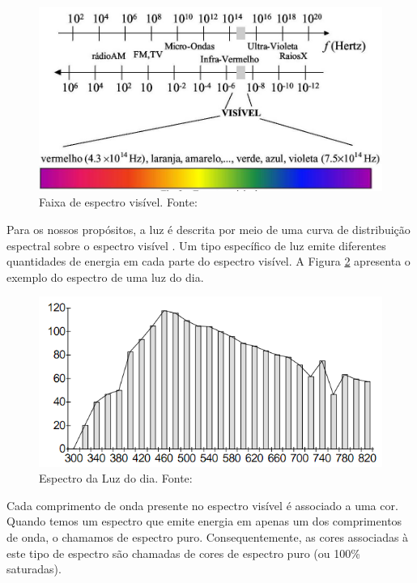 \documentclass[a4paper,10pt]{report}
\begin{document}
\begin{figure}[!htb]
     \centering
     \includegraphics[scale=0.4]{img/visible_spectrum.jpg}
     \caption{Faixa de espectro visível. Fonte:
}
     \label{fig:visible_spectrum}
\end{figure}

\par
Para os nossos propósitos, a luz é descrita por meio de uma curva de
distribuição espectral sobre o espectro visível . Um tipo específico de luz
emite diferentes quantidades de energia em cada parte do espectro visível. A
Figura \ref{fig:visible_spectrum} apresenta o exemplo do espectro de uma luz do
dia.

\begin{figure}[!htb]
     \centering
     \includegraphics[scale=0.6]{img/spectrum_light.png}
     \caption{Espectro da Luz do dia. Fonte:
}
     \label{fig:visible_spectrum}
\end{figure}

\par
Cada comprimento de onda presente no espectro visível é associado a uma cor.
Quando temos um espectro que emite energia em apenas um dos comprimentos de
onda, o chamamos de espectro puro. Consequentemente, as cores associadas à
este tipo de espectro são chamadas de cores de espectro puro (ou 100\%
saturadas).
\end{document}
